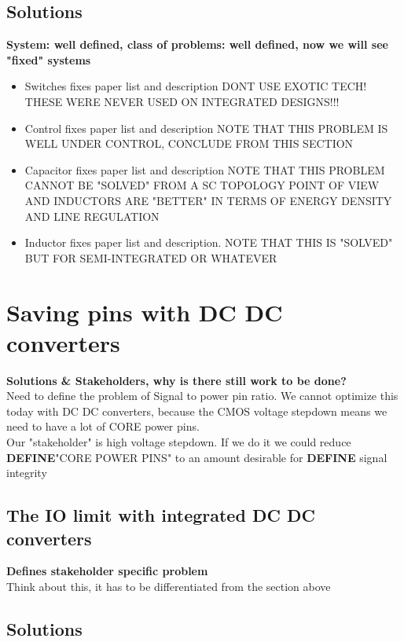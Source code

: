 \documentclass[letterpaper,twocolumn,10pt]{article}
\begin{document}
\subsection{Solutions}

\textbf{System: well defined, class of problems: well defined, now we will see "fixed" systems}\\
\begin{itemize}
\item{Switches fixes paper list and description DONT USE EXOTIC TECH! THESE WERE NEVER USED ON INTEGRATED DESIGNS!!!}
\item{Control fixes paper list and description NOTE THAT THIS PROBLEM IS WELL UNDER CONTROL, CONCLUDE FROM THIS SECTION}
\item{Capacitor fixes paper list and description NOTE THAT THIS PROBLEM CANNOT BE "SOLVED" FROM A SC TOPOLOGY POINT OF VIEW AND INDUCTORS ARE "BETTER" IN TERMS OF ENERGY DENSITY AND LINE REGULATION}
\item{Inductor fixes paper list and description. NOTE THAT THIS IS "SOLVED" BUT FOR SEMI-INTEGRATED OR WHATEVER}
\end{itemize}

\section{Saving pins with DC DC converters}

\textbf{Solutions \& Stakeholders, why is there still work to be done?}\\
Need to define the problem of Signal to power pin ratio. We cannot optimize this today with DC DC converters, because the \@ CMOS voltage stepdown means we need to have a lot of CORE power pins.\\
Our "stakeholder" is high voltage stepdown. If we do it we could reduce \textbf{DEFINE}"CORE POWER PINS" to an amount desirable for \textbf{DEFINE} signal integrity\\

\subsection{The IO limit with integrated DC DC converters}

\textbf{Defines stakeholder specific problem}\\
Think about this, it has to be differentiated from the section above

\subsection{Solutions}
\end{document}
